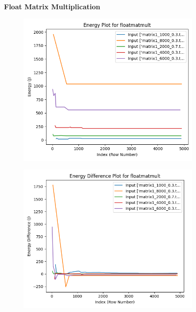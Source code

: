 \documentclass[times, 10pt,twocolumn]{article}
\begin{document}
\begin{figure}[ht]
   \centering
   \textbf{Float Matrix Multiplication}\par\medskip
   \begin{subfigure}[b]{0.22\textwidth}
     \includegraphics[width=\textwidth]{imgs/final_experiment_plots/model_analysis/measurement_data_analysis/matmult_energy.png}
     \caption{}
     \label{fig:matmultenergy}
   \end{subfigure}
   \hfill
   \begin{subfigure}[b]{0.22\textwidth}
      \includegraphics[width=\textwidth]{imgs/final_experiment_plots/model_analysis/measurement_data_analysis/matmult_energy_diff.png}

\end{subfigure}
\end{figure}
\end{document}
